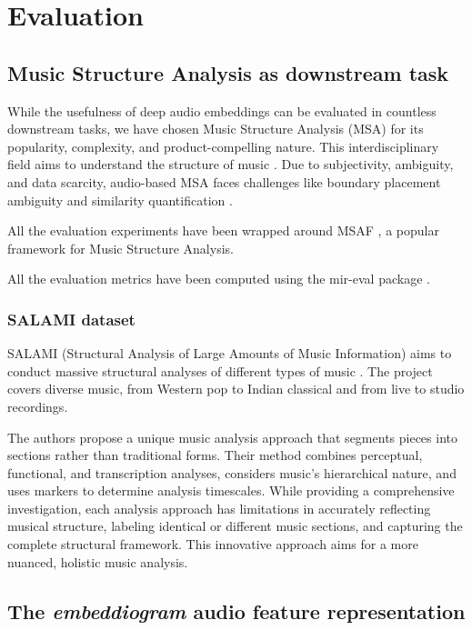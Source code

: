 \chapter{Evaluation}

\section{Music Structure Analysis as downstream task}

While the usefulness of deep audio embeddings can be evaluated in countless downstream tasks, we have chosen Music Structure Analysis (MSA) for its popularity, complexity, and product-compelling nature. This interdisciplinary field aims to understand the structure of music \cite{Nieto2020Audio-BasedApplications}. Due to subjectivity, ambiguity, and data scarcity, audio-based MSA faces challenges like boundary placement ambiguity and similarity quantification \cite{NietoPerceptualMusic}.  

All the evaluation experiments have been wrapped around MSAF \cite{NietoMSAF:FRAMEWORK}, a popular framework for Music Structure Analysis.

All the evaluation metrics have been computed using the mir-eval package \cite{RaffelMir_eval:METRICS}.

\subsection{SALAMI dataset}

SALAMI (Structural Analysis of Large Amounts of Music Information) aims to conduct massive structural analyses of different types of music \cite{Smith2011DESIGNANNOTATIONS}. The project covers diverse music, from Western pop to Indian classical and from live to studio recordings.

The authors propose a unique music analysis approach that segments pieces into sections rather than traditional forms. Their method combines perceptual, functional, and transcription analyses, considers music's hierarchical nature, and uses markers to determine analysis timescales. While providing a comprehensive investigation, each analysis approach has limitations in accurately reflecting musical structure, labeling identical or different music sections, and capturing the complete structural framework. This innovative approach aims for a more nuanced, holistic music analysis.

\section{The \textit{embeddiogram} audio feature representation}

